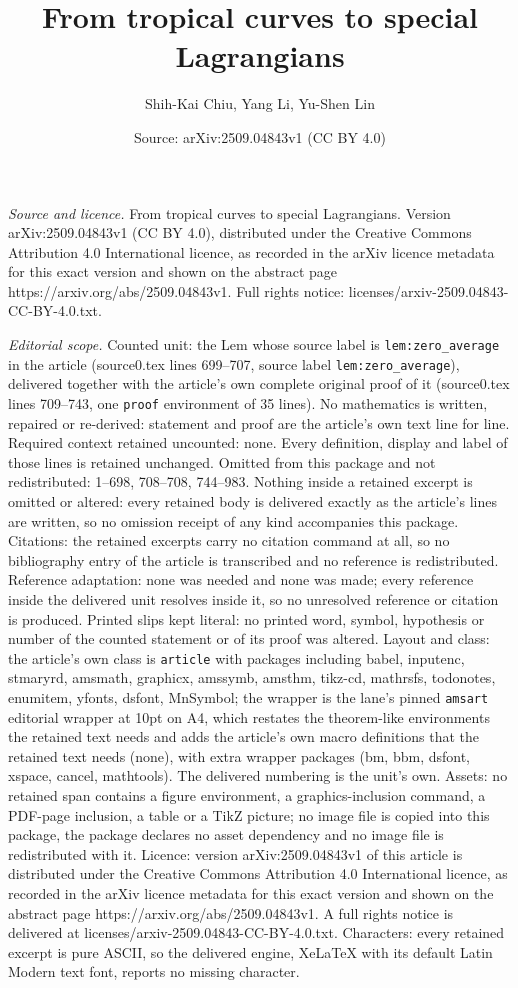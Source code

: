 \documentclass[10pt,a4paper]{amsart}
\title[From tropical curves to special Lagrangians]{From tropical curves to special Lagrangians}
\author{Shih-Kai Chiu, Yang Li, Yu-Shen Lin}
\date{Source: arXiv:2509.04843v1 (CC BY 4.0)}
\begin{document}
\maketitle

\noindent\emph{Source and licence.} From tropical curves to special Lagrangians. Version arXiv:2509.04843v1 (CC BY 4.0), distributed under the Creative Commons Attribution 4.0 International licence, as recorded in the arXiv licence metadata for this exact version and shown on the abstract page https://arxiv.org/abs/2509.04843v1. Full rights notice: licenses/arxiv-2509.04843-CC-BY-4.0.txt.\par\smallskip

\noindent\textit{Editorial scope.} Counted unit: the Lem whose source label is \texttt{lem:zero\_average} in the article (source0.tex lines 699--707, source label \texttt{lem:zero\_average}), delivered together with the article's own complete original proof of it (source0.tex lines 709--743, one \texttt{proof} environment of 35 lines). No mathematics is written, repaired or re-derived: statement and proof are the article's own text line for line. Required context retained uncounted: none. Every definition, display and label of those lines is retained unchanged. Omitted from this package and not redistributed: 1--698, 708--708, 744--983. Nothing inside a retained excerpt is omitted or altered: every retained body is delivered exactly as the article's lines are written, so no omission receipt of any kind accompanies this package. Citations: the retained excerpts carry no citation command at all, so no bibliography entry of the article is transcribed and no reference is redistributed. Reference adaptation: none was needed and none was made; every reference inside the delivered unit resolves inside it, so no unresolved reference or citation is produced. Printed slips kept literal: no printed word, symbol, hypothesis or number of the counted statement or of its proof was altered. Layout and class: the article's own class is \texttt{article} with packages including babel, inputenc, stmaryrd, amsmath, graphicx, amssymb, amsthm, tikz-cd, mathrsfs, todonotes, enumitem, yfonts, dsfont, MnSymbol; the wrapper is the lane's pinned \texttt{amsart} editorial wrapper at 10pt on A4, which restates the theorem-like environments the retained text needs and adds the article's own macro definitions that the retained text needs (none), with extra wrapper packages (bm, bbm, dsfont, xspace, cancel, mathtools). The delivered numbering is the unit's own. Assets: no retained span contains a figure environment, a graphics-inclusion command, a PDF-page inclusion, a table or a TikZ picture; no image file is copied into this package, the package declares no asset dependency and no image file is redistributed with it. Licence: version arXiv:2509.04843v1 of this article is distributed under the Creative Commons Attribution 4.0 International licence, as recorded in the arXiv licence metadata for this exact version and shown on the abstract page https://arxiv.org/abs/2509.04843v1. A full rights notice is delivered at licenses/arxiv-2509.04843-CC-BY-4.0.txt. Characters: every retained excerpt is pure ASCII, so the delivered engine, XeLaTeX with its default Latin Modern text font, reports no missing character.
\end{document}
